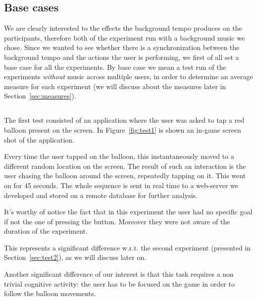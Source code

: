 \subsection{Base cases}
\label{sec:base-cases}
We are clearly interested to the effects the background tempo produces on the participants, therefore both of the experiment run with a background music we chose.
Since we wanted to see whether there is a synchronization between the background tempo and the actions the user is performing, we first of all set a base case for all the experiments. By base case we mean a test run of the experiments \emph{without} music across multiple users, in order to determine an average measure for each experiment (we will discuss about the measures later in Section~\ref{sec:measures}).

\subsection{\testfirst}
\label{sec:test1}
The first test consisted of an application where the user was asked to tap a red balloon present on the screen. In Figure~\ref{fig:test1} is shown an in-game screen shot of the application.

Every time the user tapped on the balloon, this instantaneously moved to a different random location on the screen. The result of such an interaction is the user chasing the balloon around the screen, repeatedly tapping on it. This went on for 45 seconds.
The whole sequence is sent in real time to a web-server we developed and stored on a remote database for further analysis.

It's worthy of notice the fact that in this experiment the user had no specific goal if not the one of pressing the button. Moreover they were not aware of the duration of the experiment.

This represents a significant difference w.r.t. the second experiment (presented in Section~\ref{sec:test2}), as we will discuss later on.

Another significant difference of our interest is that this task requires a non trivial cognitive activity: the user has to be focused on the game in order to follow the balloon movements.


